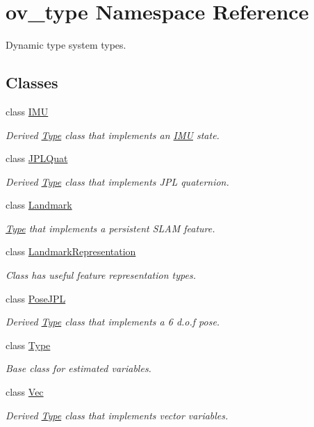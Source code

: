 \hypertarget{namespaceov__type}{}\section{ov\+\_\+type Namespace Reference}
\label{namespaceov__type}


Dynamic type system types.  


\subsection*{Classes}
\begin{DoxyCompactItemize}
\item 
class \hyperlink{classov__type_1_1IMU}{I\+MU}
\begin{DoxyCompactList}\small\item\em Derived \hyperlink{classov__type_1_1Type}{Type} class that implements an \hyperlink{classov__type_1_1IMU}{I\+MU} state. \end{DoxyCompactList}\item 
class \hyperlink{classov__type_1_1JPLQuat}{J\+P\+L\+Quat}
\begin{DoxyCompactList}\small\item\em Derived \hyperlink{classov__type_1_1Type}{Type} class that implements J\+PL quaternion. \end{DoxyCompactList}\item 
class \hyperlink{classov__type_1_1Landmark}{Landmark}
\begin{DoxyCompactList}\small\item\em \hyperlink{classov__type_1_1Type}{Type} that implements a persistent S\+L\+AM feature. \end{DoxyCompactList}\item 
class \hyperlink{classov__type_1_1LandmarkRepresentation}{Landmark\+Representation}
\begin{DoxyCompactList}\small\item\em Class has useful feature representation types. \end{DoxyCompactList}\item 
class \hyperlink{classov__type_1_1PoseJPL}{Pose\+J\+PL}
\begin{DoxyCompactList}\small\item\em Derived \hyperlink{classov__type_1_1Type}{Type} class that implements a 6 d.\+o.\+f pose. \end{DoxyCompactList}\item 
class \hyperlink{classov__type_1_1Type}{Type}
\begin{DoxyCompactList}\small\item\em Base class for estimated variables. \end{DoxyCompactList}\item 
class \hyperlink{classov__type_1_1Vec}{Vec}
\begin{DoxyCompactList}\small\item\em Derived \hyperlink{classov__type_1_1Type}{Type} class that implements vector variables. \end{DoxyCompactList}\end{DoxyCompactItemize}


